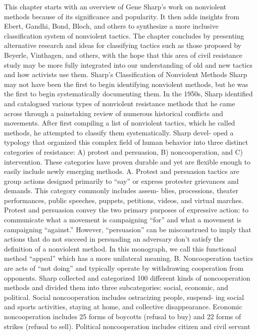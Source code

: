 \documentclass[twoside,a4paper,12pt,fleqn,openany]{extbook}
\begin{document}
This chapter starts with an overview of Gene Sharp’s work on nonviolent methods because
of its significance and popularity. It then adds insights from Ebert, Gandhi, Bond, Bloch, and
others to synthesize a more inclusive classification system of nonviolent tactics.
The chapter concludes by presenting alternative research and ideas for classifying tactics
such as those proposed by Beyerle, Vinthagen, and others, with the hope that this area of
civil resistance study may be more fully integrated into our understanding of old and new
tactics and how activists use them.
Sharp’s Classification of Nonviolent Methods
Sharp may not have been the first to begin identifying nonviolent methods, but he was the
first to begin systematically documenting them. In the 1950s, Sharp identified and catalogued
various types of nonviolent resistance methods that he came across through a painstaking
review of numerous historical conflicts and movements. After first compiling a list of nonviolent
tactics, which he called methods, he attempted to classify them systematically. Sharp devel-
oped a typology that organized this complex field of human behavior into three distinct
categories of resistance: A) protest and persuasion, B) noncooperation, and C) intervention.
These categories have proven durable and yet are flexible enough to easily include newly
emerging methods.
A.	 Protest and persuasion tactics are group actions designed primarily to “say” or
express protester grievances and demands. This category commonly includes assem-
blies, processions, theater performances, public speeches, puppets, petitions, videos,
and virtual marches. Protest and persuasion convey the two primary purposes of
expressive action: to communicate what a movement is campaigning “for” and what
a movement is campaigning “against.” However, “persuasion” can be misconstrued
to imply that actions that do not succeed in persuading an adversary don’t satisfy the
definition of a nonviolent method. In this monograph, we call this functional method
“appeal” which has a more unilateral meaning.
B.	 Noncooperation tactics are acts of “not doing” and typically operate by withdrawing
cooperation from opponents. Sharp collected and categorized 100 different kinds of
noncooperation methods and divided them into three subcategories: social,
economic, and political. Social noncooperation includes ostracizing people, suspend-
ing social and sports activities, staying at home, and collective disappearance.
Economic noncooperation includes 25 forms of boycotts (refusal to buy) and 22 forms
of strikes (refusal to sell). Political noncooperation includes citizen and civil servant
\end{document}
